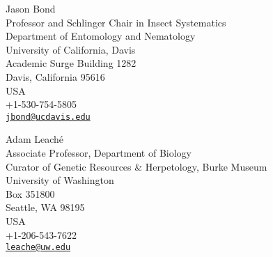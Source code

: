 Jason Bond \\
\myIndent Professor and Schlinger Chair in Insect Systematics \\
\myIndent Department of Entomology and Nematology \\
\myIndent University of California, Davis \\
\myIndent Academic Surge Building 1282 \\
\myIndent Davis, California 95616 \\
\myIndent USA \\
\myIndent +1-530-754-5805 \\
\myIndent \href{mailto:jbond@ucdavis.edu}{\tt jbond@ucdavis.edu}



Adam Leach\'{e} \\
\myIndent Associate Professor, Department of Biology \\
\myIndent Curator of Genetic Resources \& Herpetology, Burke Museum \\
\myIndent University of Washington \\
\myIndent Box 351800 \\
\myIndent Seattle, WA 98195\\
\myIndent USA \\
\myIndent +1-206-543-7622 \\
\myIndent \href{mailto:leache@uw.edu}{\tt leache@uw.edu}

